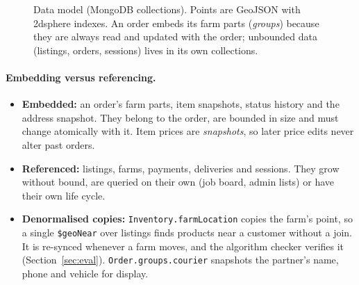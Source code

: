 \documentclass[11pt,a4paper]{article}
\begin{document}
\begin{figure}[H]
{}
\caption{Data model (MongoDB collections). Points are GeoJSON with 2dsphere indexes. An order embeds its farm parts (\emph{groups}) because they are always read and updated with the order; unbounded data (listings, orders, sessions) lives in its own collections.}
\label{fig:er}
\end{figure}

\paragraph{Embedding versus referencing.}
\begin{itemize}
  \item \textbf{Embedded:} an order's farm parts, item snapshots, status history and the address snapshot. They belong to the order, are bounded in size and must change atomically with it. Item prices are \emph{snapshots}, so later price edits never alter past orders.
  \item \textbf{Referenced:} listings, farms, payments, deliveries and sessions. They grow without bound, are queried on their own (job board, admin lists) or have their own life cycle.
  \item \textbf{Denormalised copies:} \texttt{Inventory.farmLocation} copies the farm's point, so a single \texttt{\$geoNear} over listings finds products near a customer without a join. It is re-synced whenever a farm moves, and the algorithm checker verifies it (Section~\ref{sec:eval}). \texttt{Order.groups.courier} snapshots the partner's name, phone and vehicle for display.
\end{itemize}
\end{document}
